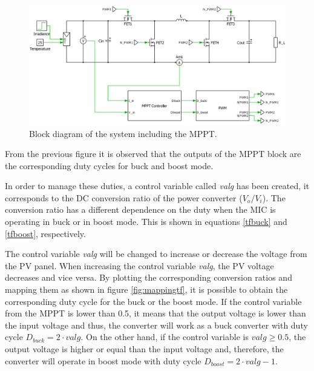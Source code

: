 \begin{figure}[H]
	\begin{center}
		\includegraphics[width=1\textwidth]{../Pictures/BD_implementation_POalgorithm}
		\caption{Block diagram of the system including the MPPT.}
		\label{BD_POalgorithm}
	\end{center}	
\end{figure}

From the previous figure it is observed that the outputs of the MPPT block are the corresponding duty cycles for buck and boost mode. 

In order to manage these duties, a control variable called \textit{valg} has been created, it corresponds to the DC conversion ratio of the power converter ($V_{o}/V_{i}$). The conversion ratio has a different dependence on the duty when the MIC is operating in buck or in boost mode. This is shown in equations \ref{tfbuck} and \ref{tfboost}, respectively. 

The control variable \textit{valg} will be changed to increase or decrease the voltage from the PV panel. When increasing the control variable \textit{valg}, the PV voltage decreases and vice versa.
By plotting the corresponding conversion ratios and mapping them as shown in figure \ref{fig:mappingtf}, it is possible to obtain the corresponding duty cycle for the buck or the boost mode. If the control variable from the MPPT is lower than 0.5, it  means that the output voltage is lower than the input voltage and thus, the converter will work as a buck converter with duty cycle $D_{buck}=2 \cdot valg$. On the other hand, if the control variable is $valg \geq 0.5$, the output voltage is higher or equal than the input voltage and, therefore, the converter will operate in boost mode with duty cycle $D_{boost}=2\cdot valg - 1$. %

